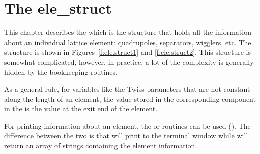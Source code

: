 \chapter{The ele_struct}
\label{c:ele.struct}

This chapter describes the  which is the structure that
holds all the information about an individual lattice element:
quadrupoles, separators, wigglers, etc. The  structure is
shown in Figures~\ref{f:ele.struct1}  and \ref{f:ele.struct2}. This
structure is somewhat complicated, however, in practice, a lot of the
complexity is generally hidden  by the \bmad bookkeeping routines.

As a general rule, for variables like the Twiss parameters that are not
constant along the length of an element, the value stored in the
corresponding component in the  is the value at the exit
end of the element.

For printing information about an element, the
 or  routines
can be used (). The difference between the two is
that  will print to the terminal window while 
will return an array of strings containing the element information.

